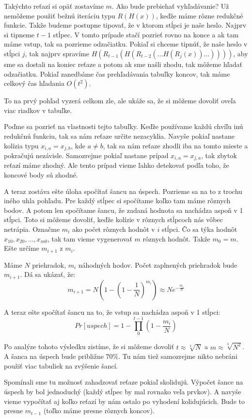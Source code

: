 Takýchto reťazí si opäť zostavíme $m$. Ako bude prebiehať vyhľadávanie? 
Už nemôžeme použiť bežnú iteráciu typu $R(H(x))$, keďže máme rôzne redukčné funkcie.
Takže budeme postupne tipovať, že v ktorom stĺpci je naše heslo. Najprv si tipneme $t-1$
stĺpec. V tomto prípade stačí pozrieť rovno na konce a ak tam máme vstup, tak sa pozrieme odzačiatku.
Pokiaľ si chceme tipnúť, že naše heslo v stĺpci $j$, tak najprv spravíme $H(R_{t-1}(H(R_{t-2}(\dots H(R_j(x))\dots))))$, aby
sme sa dostali na koniec reťaze a potom ak sme našli zhodu, tak môžeme hľadať odzačiatku.
Pokiaľ zanedbáme čas prehľadávania tabuľky koncov, tak máme celkový čas hľadania $O(t^2)$. 

To na prvý pohľad vyzerá celkom zle, ale ukáže sa, že si môžeme dovoliť oveľa viac riadkov v tabuľke.

Poďme sa pozrieť na vlastnosti tejto tabuľky. Keďže používame každú chvíľu inú redukčnú funkciu, tak sa nám
reťaze určite nezacyklia. Navyše pokiaľ nastane kolízia typu $x_{i,a} = x_{j,b}$, kde $a\neq b$, tak sa nám
reťaze zhodli iba na tomto mieste a pokračujú nezávisle. Samozrejme pokiaľ nastane prípad $x_{i,a} = x_{j,a}$, tak
zbytok reťazí máme zhodný. Ale tento prípad vieme ľahko detekovať podľa toho, že koncové body sú zhodné.

A teraz zostáva ešte úloha spočítať šancu na úspech.
Pozrieme sa na to z trochu iného uhla pohľadu. Pre každý stĺpec si spočítame koľko tam máme rôznych bodov.
A potom len spočítame šancu, že zadaná hodnota sa nachádza aspoň v 1 stĺpci. Toto si môžeme dovoliť, keďže
kolízie v rôznych stĺpcoch nás vôbec netrápia. 
Označme $m_i$ ako počet rôznych hodnôt v $i$ stĺpci.
Čo sa týka hodnôt $x_{10}, x_{20}, \dots, x_{m0}$, tak tam vieme vygenerovať $m$ rôznych hodnôt.
Takže $m_0 = m$. Ešte určíme $m_{i+1}$ z $m_i$.

Máme $N$ priehradok, $m_i$ náhodných hodov. Počet zaplnených priehradok bude $m_{i+1}$. 
Dá sa ukázať, že:
\begin{equation*}
m_{i+1} = N \left ( 1 - (1 - \frac{1}{N})^{m_i} \right ) \approx N e^{-\frac{m_i}{N}}
\end{equation*}

A teraz ešte spočítať šancu na to, že vstup sa nachádza aspoň v 1 stĺpci:
\begin{equation*}
Pr[uspech] = 1 - \prod_0^{t-1} \left (1 - \frac{m_i}{N} \right)
\end{equation*}

Po analýze tohoto výsledku zistíme, že si môžeme dovoliť
$t \approx \sqrt[3]{N}$ a $m \approx \sqrt[3]{N^2}$. A šanca na úspech bude približne $70\%$.
Tu nám tiež samozrejme nikto nebráni použiť viac tabuliek na zvýšenie šancí.

\begin{poznamka}
Spomínali sme tu možnosť zahadzovať reťaze pokiaľ skolidujú. Výpočet šance na úspech by
bol jednoduchý (každý stĺpec by mal rovnako veľa prvkov). A navyše vieme vypočítať aj koľko
reťazí by nám ostalo po vyhodení kolidujúcich. Bude to presne $m_{t-1}$ 
(toľko máme presne rôznych koncov).
\end{poznamka}
